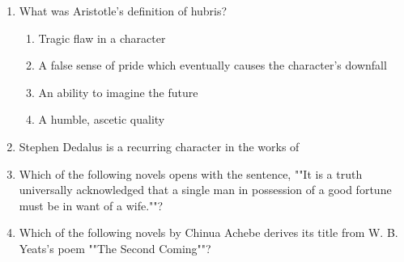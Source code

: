 \documentclass[12pt]{article}
\theoremstyle{remark}
\begin{document}
\begin{enumerate}
\begin{enumerate}
 \end{enumerate}
\hfill{}
\item What was Aristotle's definition of hubris? 
\begin{enumerate} 
\item Tragic flaw in a character 
\item A false sense of pride which eventually causes the character's downfall 
\item An ability to imagine the future 
\item A humble, ascetic quality 
\end{enumerate}
\hfill{}
\item Stephen Dedalus is a recurring character in the works of 
\begin{enumerate}  \end{enumerate}
\hfill{}
\item Which of the following novels opens with the sentence, ""It is a truth universally
acknowledged that a single man in possession of a good fortune must be in want
of a wife.""? 
\begin{enumerate}  \end{enumerate}
\hfill{}
\item Which of the following novels by Chinua Achebe derives its title from W. B.
Yeats's poem ""The Second Coming""? 
\begin{enumerate} 
\end{enumerate}
\end{enumerate}
\end{document}
